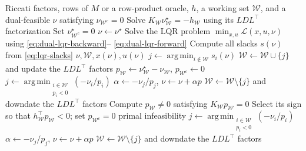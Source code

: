\documentclass[11pt]{article}
\newcommand{\argmin}{\operatorname*{arg\,min}}
\begin{document}
\begin{algorithm}[t]
\caption{Structured dual active-set method}
\label{alg:das}
\begin{algorithmic}[1]
\Require Riccati factors, rows of \(M\) or a row-product oracle,
\(h\), a working set \(\mathcal W\), and a dual-feasible \(\nu\)
satisfying \(\nu_{\mathcal W^c}=0\)
\Loop
        \State Solve
        \(K_{\mathcal W}\nu_{\mathcal W}^\star=-h_{\mathcal W}\)
        using its \(LDL^\top\) factorization
        \State Set
        \(\nu_{\mathcal W^c}^\star=0\)
            \State \(\nu\gets\nu^\star\)
            \State Solve the LQR problem
            \(\min_{x,u}\mathcal L(x,u,\nu)\)
            using \eqref{eq:dual-lqr-backward}--%
            \eqref{eq:dual-lqr-forward}
            \State Compute all slacks \(s(\nu)\) from
            \eqref{eq:lqr-slacks}
                \State \Return \(\nu,\mathcal W,x(\nu),u(\nu)\)
            \Else
                \State
                \(j\gets\argmin_{i\notin\mathcal W}s_i(\nu)\)
                \State
                \(\mathcal W\gets\mathcal W\cup\{j\}\)
                and update the \(LDL^\top\) factors
            \EndIf
        \Else
            \State
            \(p_{\mathcal W}\gets
            \nu_{\mathcal W}^\star-\nu_{\mathcal W}\),
            \(p_{\mathcal W^c}\gets0\)
            \State
            \(j\gets
            \argmin_{\substack{i\in\mathcal W\\p_i<0}}
            (-\nu_i/p_i)\)
            \State
            \(\alpha\gets-\nu_j/p_j\),
            \(\nu\gets\nu+\alpha p\)
            \State
            \(\mathcal W\gets\mathcal W\setminus\{j\}\)
            and downdate the \(LDL^\top\) factors
        \EndIf
    \Else
        \State Compute \(p_{\mathcal W}\neq0\) satisfying
        \(K_{\mathcal W}p_{\mathcal W}=0\)
        \State Select its sign so that
        \(h_{\mathcal W}^\top p_{\mathcal W}<0\);
        set \(p_{\mathcal W^c}=0\)
            \State \Return primal infeasibility
        \Else
            \State
            \(j\gets
            \argmin_{\substack{i\in\mathcal W\\p_i<0}}
            (-\nu_i/p_i)\)
            \State
            \(\alpha\gets-\nu_j/p_j\),
            \(\nu\gets\nu+\alpha p\)
            \State
            \(\mathcal W\gets\mathcal W\setminus\{j\}\)
            and downdate the \(LDL^\top\) factors
        \EndIf
    \EndIf
\EndLoop
\end{algorithmic}
\end{algorithm}
\end{document}
